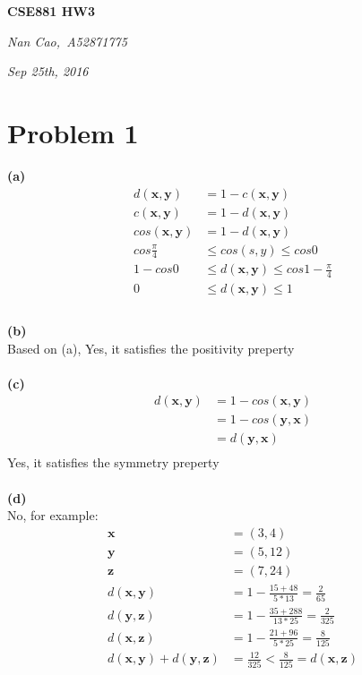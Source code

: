 \documentclass[11pt]{scrartcl}
\begin{document}
\centerline{\LARGE{\textbf{CSE881 HW3}}}
\centerline{\large{\textit{Nan Cao,\  A52871775}}}
\centerline{\large{\textit{Sep 25th, 2016}}}
\section*{Problem 1}
\textbf{(a)}\\
\begin{equation*}
\begin{aligned}
d(\bm{x},\bm{y})&=1-c(\bm{x},\bm{y})\\
c(\bm{x},\bm{y})&=1-d(\bm{x},\bm{y})\\
cos(\bm{x},\bm{y})&=1-d(\bm{x},\bm{y})\\
cos \frac{\pi}{4}  &\leq cos(s,y) \leq cos 0\\
1- cos 0  &\leq d(\bm{x},\bm{y}) \leq cos 1-\frac{\pi}{4}\\
0  &\leq d(\bm{x},\bm{y}) \leq 1\\
\end{aligned}
\end{equation*}
\\
\textbf{(b)}\\
Based on (a), Yes, it satisfies the positivity preperty\\
\\
\textbf{(c)}\\
\begin{equation*}
\begin{aligned}
d(\bm{x},\bm{y})&=1-cos(\bm{x},\bm{y})\\
&=1-cos(\bm{y},\bm{x})\\
&=d(\bm{y},\bm{x})\\
\end{aligned}
\end{equation*}
 Yes, it satisfies the symmetry preperty\\
 \\
 \textbf{(d)}\\
 No, for example:
\begin{equation*}
\begin{aligned}
\bm{x}&=(3,4)\\
\bm{y}&=(5,12)\\
\bm{z}&=(7,24)\\
d(\bm{x},\bm{y})&=1-\frac{15+48}{5*13}=\frac{2}{65}\\
d(\bm{y},\bm{z})&=1-\frac{35+288}{13*25}=\frac{2}{325}\\
d(\bm{x},\bm{z})&=1-\frac{21+96}{5*25}=\frac{8}{125}\\
d(\bm{x},\bm{y})+d(\bm{y},\bm{z})&=\frac{12}{325}<\frac{8}{125}=d(\bm{x},\bm{z})\\
\end{aligned}
\end{equation*}
\end{document}
